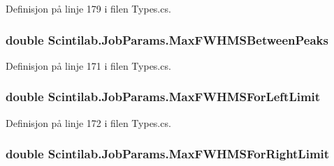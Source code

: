 Definisjon på linje 179 i filen Types.\+cs.

\hypertarget{class_scintilab_1_1_job_params_a947ec9aa050ad8c2ac496071bfb18aa7}{
\subsubsection[{Max\+F\+W\+H\+M\+S\+Between\+Peaks}]{\setlength{\rightskip}{0pt plus 5cm}double Scintilab.\+Job\+Params.\+Max\+F\+W\+H\+M\+S\+Between\+Peaks}}\label{class_scintilab_1_1_job_params_a947ec9aa050ad8c2ac496071bfb18aa7}


Definisjon på linje 171 i filen Types.\+cs.

\hypertarget{class_scintilab_1_1_job_params_adf3e9f8affd2eafb0372f78a22c0f96e}{
\subsubsection[{Max\+F\+W\+H\+M\+S\+For\+Left\+Limit}]{\setlength{\rightskip}{0pt plus 5cm}double Scintilab.\+Job\+Params.\+Max\+F\+W\+H\+M\+S\+For\+Left\+Limit}}\label{class_scintilab_1_1_job_params_adf3e9f8affd2eafb0372f78a22c0f96e}


Definisjon på linje 172 i filen Types.\+cs.

\hypertarget{class_scintilab_1_1_job_params_a5d802288df6d97edde4ea8841a70d16b}{
\subsubsection[{Max\+F\+W\+H\+M\+S\+For\+Right\+Limit}]{\setlength{\rightskip}{0pt plus 5cm}double Scintilab.\+Job\+Params.\+Max\+F\+W\+H\+M\+S\+For\+Right\+Limit}}\label{class_scintilab_1_1_job_params_a5d802288df6d97edde4ea8841a70d16b}


